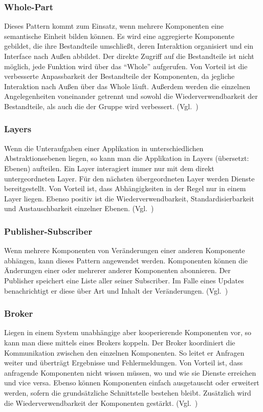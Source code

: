 \subsubsection{Whole-Part}
Dieses Pattern kommt zum Einsatz, wenn mehrere Komponenten eine semantische Einheit bilden können.
Es wird eine aggregierte Komponente gebildet, die ihre Bestandteile umschließt, deren Interaktion organisiert und ein Interface nach Außen abbildet.
Der direkte Zugriff auf die Bestandteile ist nicht möglich, jede Funktion wird über das \enquote{Whole} aufgerufen.
Von Vorteil ist die verbesserte Anpassbarkeit der Bestandteile der Komponenten, da jegliche Interaktion nach Außen über das Whole läuft.
Außerdem werden die einzelnen Angelegenheiten voneinander getrennt und sowohl die Wiederverwendbarkeit der Bestandteile, als auch die der Gruppe wird verbessert.
(Vgl.~\cite{buschmann-pattern-oriented-software-architecture})

\subsubsection{Layers}
Wenn die Unteraufgaben einer Applikation in unterschiedlichen Abstraktionsebenen liegen, so kann man die Applikation in Layers (übersetzt: Ebenen) aufteilen.
Ein Layer interagiert immer nur mit dem direkt untergeordneten Layer.
Für den nächsten übergeordneten Layer werden Dienste bereitgestellt.
Von Vorteil ist, dass Abhängigkeiten in der Regel nur in einem Layer liegen.
Ebenso positiv ist die Wiederverwendbarkeit, Standardisierbarkeit und Austauschbarkeit einzelner Ebenen.
(Vgl.~\cite{buschmann-pattern-oriented-software-architecture})

\subsubsection{Publisher-Subscriber}
Wenn mehrere Komponenten von Veränderungen einer anderen Komponente abhängen, kann dieses Pattern angewendet werden.
Komponenten können die Änderungen einer oder mehrerer anderer Komponenten abonnieren.
Der Publisher speichert eine Liste aller seiner Subscriber.
Im Falle eines Updates benachrichtigt er diese über Art und Inhalt der Veränderungen.
(Vgl.~\cite{buschmann-pattern-oriented-software-architecture})

\subsubsection{Broker}
Liegen in einem System unabhängige aber kooperierende Komponenten vor, so kann man diese mittels eines Brokers koppeln.
Der Broker koordiniert die Kommunikation zwischen den einzelnen Komponenten.
So leitet er Anfragen weiter und überträgt Ergebnisse und Fehlermeldungen.
Von Vorteil ist, dass anfragende Komponenten nicht wissen müssen, wo und wie sie Dienste erreichen und vice versa.
Ebenso können Komponenten einfach ausgetauscht oder erweitert werden, sofern die grundsätzliche Schnittstelle bestehen bleibt.
Zusätzlich wird die Wiederverwendbarkeit der Komponenten gestärkt.
(Vgl.~\cite{buschmann-pattern-oriented-software-architecture})

